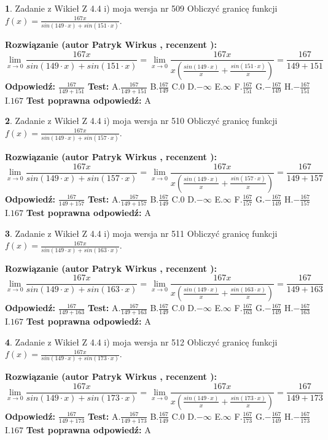\documentclass[12pt, a4paper]{article}
\theoremstyle{definition} %
\newtheorem{zad}{}
\newcommand{\zadStart}[1]{\begin{zad}#1\newline}
\newcommand{\zadStop}{\end{zad}}
\newcommand{\rozwStart}[2]{\noindent \textbf{Rozwiązanie (autor #1 , recenzent #2): }\newline}
\newcommand{\rozwStop}{\newline}
\newcommand{\odpStart}{\noindent \textbf{Odpowiedź:}\newline}
\newcommand{\odpStop}{\newline}
\newcommand{\testStart}{\noindent \textbf{Test:}\newline}
\newcommand{\testStop}{\newline}
\newcommand{\kluczStart}{\noindent \textbf{Test poprawna odpowiedź:}\newline}
\newcommand{\kluczStop}{\newline}
\begin{document}
\zadStart{Zadanie z Wikieł Z 4.4 i) moja wersja nr 509}
Obliczyć granicę funkcji $f(x)=\frac{167x}{sin(149\cdot x) +sin(151\cdot x)}$.
\zadStop
\rozwStart{Patryk Wirkus}{}
$$\lim\limits_{x\to 0}\frac{167x}{sin(149\cdot x) +sin(151\cdot x)}=\lim\limits_{x\to 0}\frac{167x}{x(\frac{sin(149\cdot x)}{x}+\frac{sin(151\cdot x)}{x})}=\frac{167}{149+151}$$
\rozwStop
\odpStart
$\frac{167}{149+151}$
\odpStop
\testStart
A.$\frac{167}{149+151}$
B.$\frac{167}{149}$
C.$0$
D.$-\infty$
E.$\infty$
F.$\frac{167}{151}$
G.$-\frac{167}{149}$
H.$-\frac{167}{151}$
I.$167$
\testStop
\kluczStart
A
\kluczStop



\zadStart{Zadanie z Wikieł Z 4.4 i) moja wersja nr 510}
Obliczyć granicę funkcji $f(x)=\frac{167x}{sin(149\cdot x) +sin(157\cdot x)}$.
\zadStop
\rozwStart{Patryk Wirkus}{}
$$\lim\limits_{x\to 0}\frac{167x}{sin(149\cdot x) +sin(157\cdot x)}=\lim\limits_{x\to 0}\frac{167x}{x(\frac{sin(149\cdot x)}{x}+\frac{sin(157\cdot x)}{x})}=\frac{167}{149+157}$$
\rozwStop
\odpStart
$\frac{167}{149+157}$
\odpStop
\testStart
A.$\frac{167}{149+157}$
B.$\frac{167}{149}$
C.$0$
D.$-\infty$
E.$\infty$
F.$\frac{167}{157}$
G.$-\frac{167}{149}$
H.$-\frac{167}{157}$
I.$167$
\testStop
\kluczStart
A
\kluczStop



\zadStart{Zadanie z Wikieł Z 4.4 i) moja wersja nr 511}
Obliczyć granicę funkcji $f(x)=\frac{167x}{sin(149\cdot x) +sin(163\cdot x)}$.
\zadStop
\rozwStart{Patryk Wirkus}{}
$$\lim\limits_{x\to 0}\frac{167x}{sin(149\cdot x) +sin(163\cdot x)}=\lim\limits_{x\to 0}\frac{167x}{x(\frac{sin(149\cdot x)}{x}+\frac{sin(163\cdot x)}{x})}=\frac{167}{149+163}$$
\rozwStop
\odpStart
$\frac{167}{149+163}$
\odpStop
\testStart
A.$\frac{167}{149+163}$
B.$\frac{167}{149}$
C.$0$
D.$-\infty$
E.$\infty$
F.$\frac{167}{163}$
G.$-\frac{167}{149}$
H.$-\frac{167}{163}$
I.$167$
\testStop
\kluczStart
A
\kluczStop



\zadStart{Zadanie z Wikieł Z 4.4 i) moja wersja nr 512}
Obliczyć granicę funkcji $f(x)=\frac{167x}{sin(149\cdot x) +sin(173\cdot x)}$.
\zadStop
\rozwStart{Patryk Wirkus}{}
$$\lim\limits_{x\to 0}\frac{167x}{sin(149\cdot x) +sin(173\cdot x)}=\lim\limits_{x\to 0}\frac{167x}{x(\frac{sin(149\cdot x)}{x}+\frac{sin(173\cdot x)}{x})}=\frac{167}{149+173}$$
\rozwStop
\odpStart
$\frac{167}{149+173}$
\odpStop
\testStart
A.$\frac{167}{149+173}$
B.$\frac{167}{149}$
C.$0$
D.$-\infty$
E.$\infty$
F.$\frac{167}{173}$
G.$-\frac{167}{149}$
H.$-\frac{167}{173}$
I.$167$
\testStop
\kluczStart
A
\kluczStop
\end{document}
